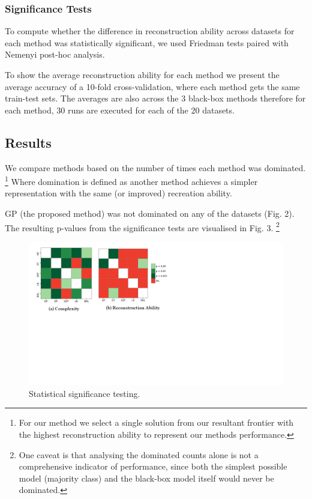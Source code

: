 \subsubsection{Significance Tests}
To compute whether the difference in reconstruction ability across datasets for each method was statistically significant, we used Friedman tests paired with Nemenyi post-hoc analysis.

To show the average reconstruction ability for each method we present the average accuracy of a 10-fold cross-validation, where each method gets the same train-test sets. The averages are also across the 3 black-box methods therefore for each method, 30 runs are executed for each of the 20 datasets.
\subsection{Results}
We compare methods based on the number of times each method was dominated. \footnote{For our method we select a single solution from our resultant frontier with the highest reconstruction ability to represent our methods performance.} Where domination is defined as another method achieves a simpler representation with the same (or improved) recreation ability.

GP (the proposed method) was not dominated on any of the datasets (Fig. 2). The resulting p-values from the significance tests are visualised in Fig. 3. \footnote{One caveat is that analysing the dominated counts alone is not a comprehensive indicator of performance, since both the simplest possible model (majority class) and the black-box model itself would never be dominated.} 
\begin{center}
\begin{figure}[h]
\includegraphics{result_analysis_resized}
\caption{Statistical significance testing.}
\end{figure}
\end{center}
